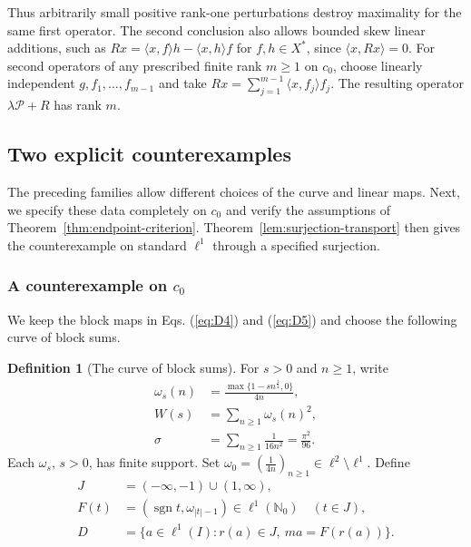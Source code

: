 \documentclass[11pt]{article}
\newcommand{\Nzero}{\mathbb N_0}
\newcommand{\sgn}{\operatorname{sgn}}
\newcommand{\pair}[2]{\langle #1,#2\rangle}
\theoremstyle{definition}
\newtheorem{definition}{Definition}
\theoremstyle{remark}
\begin{document}
Thus arbitrarily small positive rank-one perturbations destroy maximality for the same first operator. The second conclusion also allows bounded skew linear additions, such as $Rx=\pair{x}{f}h-\pair{x}{h}f$ for $f,h\in X^*$, since $\pair{x}{Rx}=0$. For second operators of any prescribed finite rank $m\ge1$ on $c_0$, choose linearly independent $g,f_1,\ldots,f_{m-1}$ and take $Rx=\sum_{j=1}^{m-1}\pair{x}{f_j}f_j$. The resulting operator $\lambda\mathcal P+R$ has rank $m$.


\subsection{Two explicit counterexamples}
The preceding families allow different choices of the curve and linear maps. Next, we specify these data completely on $c_0$ and verify the assumptions of Theorem~\ref{thm:endpoint-criterion}. Theorem~\ref{lem:surjection-transport} then gives the counterexample on standard $\ell^1$ through a specified surjection.

\subsubsection{A counterexample on $c_0$}
We keep the block maps in Eqs. (\ref{eq:D4}) and (\ref{eq:D5}) and choose the following curve of block sums.

\begin{definition}[The curve of block sums]
For $s>0$ and $n\ge1$, write
\begin{equation}
\begin{aligned}
\omega_s(n)&=\frac{\max\{1-sn^{\frac{1}{4}},0\}}{4n},\\
W(s)&=\sum_{n\ge1}\omega_s(n)^2,\\
\sigma&=\sum_{n\ge1}\frac1{16n^2}=\frac{\pi^2}{96}.
\end{aligned}
\label{eq:D6}
\end{equation}
Each $\omega_s$, $s>0$, has finite support. Set $\omega_0=(\frac{1}{4n})_{n\ge1}\in\ell^2\setminus\ell^1$. Define
\begin{equation}
\begin{aligned}
J&=(-\infty,-1)\cup(1,\infty),\\
F(t)&=(\sgn t,\omega_{|t|-1})\in\ell^1(\Nzero)\quad(t\in J),\\
D&=\{a\in\ell^1(I):r(a)\in J,\ ma=F(r(a))\}.
\end{aligned}
\label{eq:D7}
\end{equation}

\end{definition}
\end{document}
